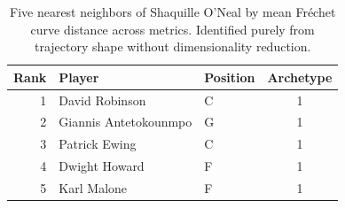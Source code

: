 \begin{table}[htbp]
  \centering\small
  \begin{tabular}{rllc}
    \toprule
    Rank & Player & Position & Archetype \\
    \midrule
    1 & David Robinson & C & 1 \\
    2 & Giannis Antetokounmpo & G & 1 \\
    3 & Patrick Ewing & C & 1 \\
    4 & Dwight Howard & F & 1 \\
    5 & Karl Malone & F & 1 \\
    \bottomrule
  \end{tabular}
  \caption{Five nearest neighbors of Shaquille O'Neal by mean Fr\'{e}chet curve distance across metrics. Identified purely from trajectory shape without dimensionality reduction.}
  \label{tab:Shaquille_O_Neal_frechet_curve_neighbors}
\end{table}

